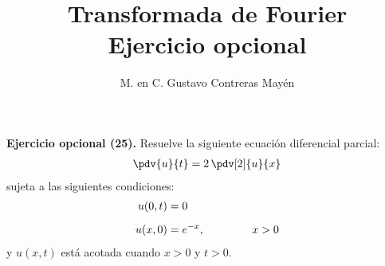 
\title{Transformada de Fourier \\[0.3em]  \large{Ejercicio opcional} \vspace{-3ex}}
\author{M. en C. Gustavo Contreras Mayén}
\date{ }


\vspace{-4cm}
\maketitle
\fontsize{14}{14}\selectfont

\noindent
\textbf{Ejercicio opcional (25).} Resuelve la siguiente ecuación diferencial parcial:
\begin{align*}
\pdv{u}{t} = 2 \, \pdv[2]{u}{x}
\end{align*}
sujeta a las siguientes condiciones:
\begin{align*}
u(0, t) &= 0 \\[0.5em]
u(x, 0) &= e^{-x}, \hspace{1.5cm} x > 0
\end{align*}
y $u(x, t)$ está acotada cuando $x > 0$ y $t > 0$.
